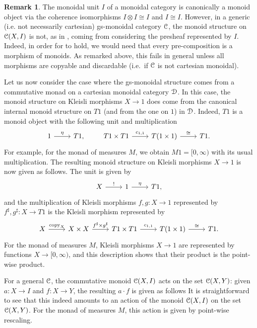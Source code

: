 \documentclass[a4paper,UKenglish,numberwithinsect,cleveref, autoref, thm-restate]{lipics-v2021}
\theoremstyle{plain} %
\theoremstyle{definition} %
\newtheorem{myremark}[mytheorem]{Remark}
\begin{document}
\begin{myremark}
 The monoidal unit $I$ of a monoidal category is canonically a monoid object via the coherence isomorphisms $I\otimes I\cong I$ and $I\cong I$. 
 However, in a generic (i.e. not necessarily cartesian) gs-monoidal category $\mathcal{C}$, the monoid structure on $\mathcal{C}(X,I)$ is not, as in , coming from considering the presheaf represented by $I$. Indeed, in order for  to hold, we would need that every pre-composition is a morphism of monoids. As remarked above, this fails in general unless all morphisms are copyable and discardable (i.e.~if $\mathcal{C}$ is not cartesian monoidal).
\end{myremark}
%
%
Let us now consider the case where the gs-monoidal structure comes from a commutative monad on a cartesian monoidal category $\mathcal{D}$. 
In this case, the monoid structure on Kleisli morphisms $X\to 1$ does come from the canonical internal monoid structure on $T1$ (and from the one on $1$) in $\mathcal{D}$.
Indeed, $T1$ is a monoid object with the following unit and multiplication~\cite[Section~10]{kock2012distributions}
 \[
 \begin{tikzcd}
  1 \ar{r}{\eta} & T1 ,
 \end{tikzcd}
 \qquad
 \begin{tikzcd}
  T1 \times T1 \ar{r}{c_{1,1}} & T(1\times 1) \ar{r}{\cong} & T1 .
 \end{tikzcd}
 \]
 For example, for the monad of measures $M$, we obtain $M1=[0,\infty)$ with its usual multiplication.
 The resulting monoid structure on Kleisli morphisms $X\to 1$ is now given as follows. The unit is given by
 \[
 \begin{tikzcd}
  X \ar{r}{!} & 1 \ar{r}{\eta} & T1 ,
 \end{tikzcd}
 \]
 and the multiplication of Kleisli morphisms $f, g : X \to 1$ represented by $f^\sharp,g^\sharp:X\to T1$ is the Kleisli morphism represented by
 \[
 \begin{tikzcd}
  X \ar{r}{\mathrm{copy}_X} & X\times X \ar{r}{f^\sharp\times g^\sharp} &
  T1 \times T1 \ar{r}{c_{1,1}} & T(1\times 1) \ar{r}{\cong} & T1 .
 \end{tikzcd}
 \]
 For the monad of measures $M$, Kleisli morphisms $X\to 1$ are represented by functions $X\to [0,\infty)$, and this description shows that their product is the point-wise product.

For a general $\mathcal{C}$, the commutative monoid $\mathcal{C}(X,I)$ acts on the set $\mathcal{C}(X,Y)$: given $a:X\to I$ and $f:X\to Y$, the resulting $a\cdot f$ is given as follows
It is straightforward to see that this indeed amounts to an action of the monoid $\mathcal{C}(X,I)$ on the set $\mathcal{C}(X,Y)$.
For the monad of measures $M$, this action is given by point-wise rescaling.
\end{document}
